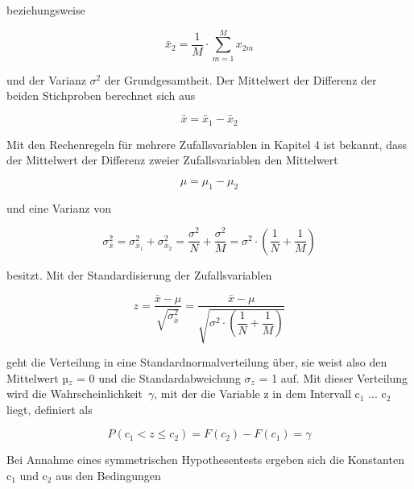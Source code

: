 \noindent beziehungsweise

\begin{equation}\label{eq:sixonehundredthree}
\bar{x}_{2} =\dfrac{1}{M} \cdot \sum _{m=1}^{M}x_{2m}
\end{equation}

\noindent und der Varianz $\sigma^{2}$ der Grundgesamtheit. Der Mittelwert der Differenz der beiden Stichproben berechnet sich aus

\begin{equation}\label{eq:sixonehundredfour}
\bar{x}=\bar{x}_{1} -\bar{x}_{2}
\end{equation}

\noindent Mit den Rechenregeln f\"{u}r mehrere Zufallsvariablen in Kapitel 4 ist bekannt, dass der Mittelwert der Differenz zweier Zufallsvariablen den Mittelwert

\begin{equation}\label{eq:sixonehundredfive}
\mu =\mu _{1} -\mu _{2}
\end{equation}

\noindent und eine Varianz von

\begin{equation}\label{eq:sixonehundredsix}
\sigma _{\bar{x}}^{2} =\sigma _{\bar{x}_{1} }^{2} +\sigma _{\bar{x}_{2} }^{2} =\dfrac{\sigma ^{2} }{N} +\dfrac{\sigma ^{2} }{M} =\sigma ^{2} \cdot \left(\dfrac{1}{N} +\dfrac{1}{M} \right)
\end{equation}

\noindent besitzt. Mit der Standardisierung der Zufallsvariablen

\begin{equation}\label{eq:sixonehundredseven}
z=\dfrac{\bar{x}-\mu }{\sqrt{\sigma _{\bar{x}}^{2} } } =\dfrac{\bar{x}-\mu }{\sqrt{\sigma ^{2} \cdot \left(\dfrac{1}{N} +\dfrac{1}{M} \right)} }
\end{equation}

\noindent geht die Verteilung in eine Standardnormalverteilung \"{u}ber, sie weist also den Mittelwert µ$_{z}$ = 0 und die Standardabweichung $\sigma_{z}$ = 1 auf. Mit dieser Verteilung wird die Wahrscheinlichkeit~$\gamma$, mit der die Variable z in dem Intervall c$_{1}$ ... c$_{2}$ liegt, definiert als

\begin{equation}\label{eq:sixonehundredeight}
P(c_{1} <z\le c_{2})=F(c_{2} )-F(c_{1} )=\gamma
\end{equation}

\noindent Bei Annahme eines symmetrischen Hypothesentests ergeben sich die Konstanten c$_{1}$ und c$_{2}$ aus den Bedingungen

